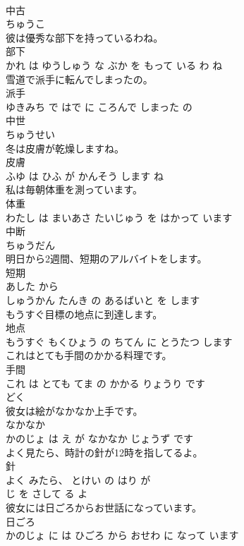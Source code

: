 \documentclass[8pt]{extreport}
\begin{document}
\begin{CJK}{UTF8}{min}
\\	中古	
\\	ちゅうこ		
\\	彼は優秀な部下を持っているわね。	
\\	部下 
\\	かれ は ゆうしゅう な ぶか を もって いる わ ね			
\\	雪道で派手に転んでしまったの。	
\\	派手 
\\	ゆきみち で はで に ころんで しまった の			
\\	中世	
\\	ちゅうせい		
\\	冬は皮膚が乾燥しますね。	
\\	皮膚 
\\	ふゆ は ひふ が かんそう します ね			
\\	私は毎朝体重を測っています。	
\\	体重 
\\	わたし は まいあさ たいじゅう を はかって います			
\\	中断	
\\	ちゅうだん		
\\	明日から2週間、短期のアルバイトをします。	
\\	短期 
\\	あした から 
\\	しゅうかん たんき の あるばいと を します			
\\	もうすぐ目標の地点に到達します。	
\\	地点 
\\	もうすぐ もくひょう の ちてん に とうたつ します			
\\	これはとても手間のかかる料理です。	
\\	手間 
\\	これ は とても てま の かかる りょうり です			
\\	どく	
\\	彼女は絵がなかなか上手です。	
\\	なかなか 
\\	かのじょ は え が なかなか じょうず です			
\\	よく見たら、時計の針が12時を指してるよ。	
\\	針 
\\	よく みたら、 とけい の はり が 
\\	じ を さして る よ			
\\	彼女には日ごろからお世話になっています。	
\\	日ごろ 
\\	かのじょ に は ひごろ から おせわ に なって います			

\end{CJK}
\end{document}

